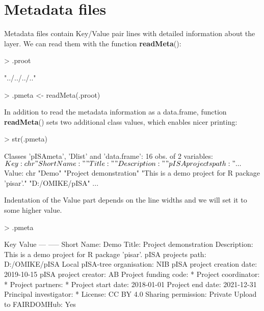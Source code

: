 \documentclass[a4paper,12pt]{article}\usepackage[]{graphicx}\usepackage[]{color}
\makeatletter
\providecommand\code{\bgroup\@codex}
\def\@codex#1{{\normalfont\ttfamily\hyphenchar\font=-1  #1}\egroup}
\providecommand{\fct}[1]{{\ttfamily\textbf{#1}()}}
\makeatother
\begin{document}
\section{Metadata files}

Metadata files contain Key/Value pair lines with detailed information about the layer. We can read them with the function \fct{readMeta}:

\begin{Schunk}
\begin{Sinput}
> .proot
\end{Sinput}
\begin{Soutput}
[1] "../../../.."
\end{Soutput}
\begin{Sinput}
> .pmeta <- readMeta(.proot)
\end{Sinput}
\end{Schunk}

In addition to read the metadata information as a \code{data.frame}, function
\fct{readMeta} sets two additional class values, which enables nicer printing:

\begin{Schunk}
\begin{Sinput}
> str(.pmeta)
\end{Sinput}
\begin{Soutput}
Classes 'pISAmeta', 'Dlist' and 'data.frame':	16 obs. of  2 variables:
 $ Key  : chr  "Short Name:" "Title:" "Description:" "pISA projects path:" ...
 $ Value: chr  "Demo" "Project demonstration" "This is a demo project for R package 'pisar'." "D:/OMIKE/pISA" ...
\end{Soutput}
\end{Schunk}

Indentation of the Value part depends on the line widths and we will set it to some higher value.

\begin{Schunk}
\begin{Sinput}
> .pmeta
\end{Sinput}
\begin{Soutput}
 Key                             Value
 ---                             -----
 Short Name:                     Demo
 Title:                          Project demonstration
 Description:                    This is a demo project for R package 'pisar'.
 pISA projects path:             D:/OMIKE/pISA
 Local pISA-tree organisation:   NIB
 pISA project creation date:     2019-10-15
 pISA project creator:           AB
 Project funding code:           *
 Project coordinator:            *
 Project partners:               *
 Project start date:             2018-01-01
 Project end date:               2021-12-31
 Principal investigator:         *
 License:                        CC BY 4.0
 Sharing permission:             Private
 Upload to FAIRDOMHub:           Yes
\end{Soutput}
\end{Schunk}
\end{document}
